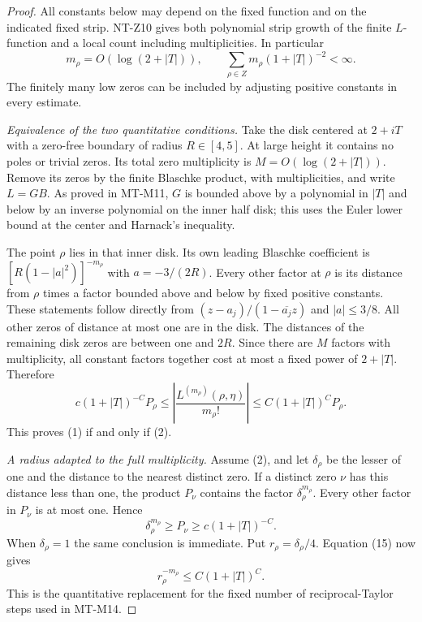 \begin{proof}
All constants below may depend on the fixed function and
on the indicated fixed strip. NT-Z10 gives both polynomial
strip growth of the finite $L$-function and a local count
including multiplicities. In particular
\[
       m_\rho=O(\log(2+|T|)),\qquad
       \sum_{\rho\in Z}m_\rho(1+|T|)^{-2}<\infty.       \tag{15}
\]
The finitely many low zeros can be included by adjusting
positive constants in every estimate.

\emph{Equivalence of the two quantitative conditions.}
Take the disk centered at $2+iT$ with a zero-free boundary
of radius $R\in[4,5]$. At large height it contains no
poles or trivial zeros. Its total zero multiplicity is
$M=O(\log(2+|T|))$. Remove its zeros by the finite
Blaschke product, with multiplicities, and write $L=GB$.
As proved in MT-M11, $G$ is bounded above by a polynomial
in $|T|$ and below by an inverse polynomial on the
inner half disk; this uses the Euler lower bound at
the center and Harnack's inequality.

The point $\rho$ lies in that inner disk. Its own leading
Blaschke coefficient is
$[R(1-|a|^2)]^{-m_\rho}$ with $a=-3/(2R)$.
Every other factor at $\rho$ is its distance from $\rho$
times a factor bounded above and below by fixed positive
constants. These statements follow directly from
$(z-a_j)/(1-\overline{a_j}z)$ and $|a|\le3/8$.
All other zeros of distance at most one are in the disk.
The distances of the remaining disk zeros are between
one and $2R$. Since there are $M$ factors with multiplicity,
all constant factors together cost at most a fixed power
of $2+|T|$. Therefore
\[
 c(1+|T|)^{-C}P_\rho
   \le\left|\frac{L^{(m_\rho)}(\rho,\eta)}{m_\rho!}\right|
   \le C(1+|T|)^C P_\rho.                              \tag{16}
\]
This proves (1) if and only if (2).

\emph{A radius adapted to the full multiplicity.}
Assume (2), and let $\delta_\rho$ be the lesser of one
and the distance to the nearest distinct zero.
If a distinct zero $\nu$ has this distance less than one,
the product $P_\nu$ contains the factor
$\delta_\rho^{m_\rho}$. Every other factor in $P_\nu$
is at most one. Hence
\[
 \delta_\rho^{m_\rho}\ge P_\nu
                         \ge c(1+|T|)^{-C}.
\]
When $\delta_\rho=1$ the same conclusion is immediate.
Put $r_\rho=\delta_\rho/4$. Equation (15) now gives
\[
                        r_\rho^{-m_\rho}
                                      \le C(1+|T|)^C. \tag{17}
\]
This is the quantitative replacement for the fixed number
of reciprocal-Taylor steps used in MT-M14.


\end{proof}
